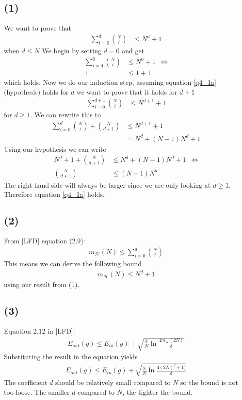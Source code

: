 \documentclass[a4paper]{article}
\begin{document}
\subsection*{(1)}
We want to prove that
\begin{align}
\sum_{i=0}^d\binom{N}{i}&\leq N^d+1
\label{q4_1a}
\end{align}
when $d\leq N$
We begin by setting $d=0$ and get
\begin{align*}
\sum_{i=0}^0\binom{N}{i}&\leq N^0+1 &\Leftrightarrow \\
1&\leq1+1
\end{align*}
which holds. Now we do our induction step, assuming equation \ref{q4_1a} (hypothesis) holds for $d$ we want to prove that it holds for $d+1$
\begin{align*}
\sum_{i=0}^{d+1}\binom{N}{i}&\leq N^{d+1}+1
\end{align*}
for $d\geq 1$. We can rewrite this to
\begin{align*}
\sum_{i=0}^{d}\binom{N}{i}+\binom{N}{d+1}&\leq N^{d+1}+1 \\
&=N^d+(N-1)N^d+1
\end{align*}
Using our hypothesis we can write
\begin{align*}
N^d+1+\binom{N}{d+1}&\leq N^d+(N-1)N^d+1 &\Leftrightarrow \\
\binom{N}{d+1}&\leq (N-1)N^d
\end{align*}
The right hand side will always be larger since we are only looking at $d\geq 1$. Therefore equation \ref{q4_1a} holds.

\subsection*{(2)}
From [LFD] equation (2.9):
\begin{align*}
m_\mathcal{H}(N)\leq \sum_{i=0}^d \binom{N}{i}
\end{align*}
This means we can derive the following bound
\begin{align*}
m_\mathcal{H}(N)\leq N^d+1
\end{align*}
using our result from (1).

\subsection*{(3)}
Equation 2.12 in [LFD]:
\begin{align*}
E_{out}(g)\leq E_{in}(g)+\sqrt{\frac{8}{N}\ln \frac{4m_{\mathcal{H}}(2N)}{\delta}}
\end{align*}
Substituting the result in the equation yields
\begin{align*}
E_{out}(g)\leq E_{in}(g)+\sqrt{\frac{8}{N}\ln \frac{4(2N)^d+1)}{\delta}}
\end{align*}
The coefficient $d$ should be relatively small compared to $N$ so the bound is not too loose. The smaller $d$ compared to $N$, the tighter the bound.
\end{document}
